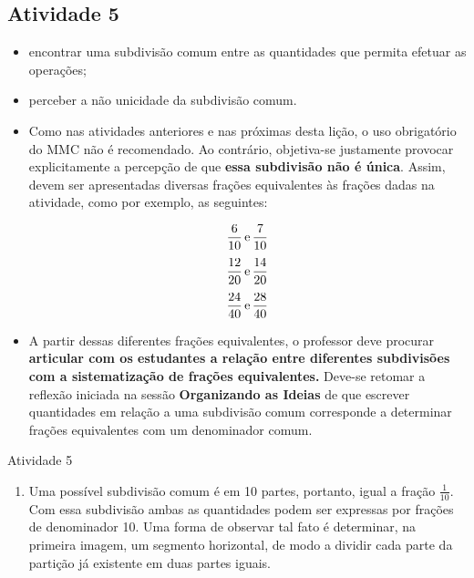\newpage
\begin{multicols}{2}
\subsection{Atividade 5}

  \newline \vspace{.15cm}

  \begin{itemize} %
    \item       encontrar uma subdivisão comum entre as quantidades que permita efetuar as operações;
    \item       perceber a não unicidade da subdivisão comum.
\end{itemize} %

   \vspace{.15cm}

  \begin{itemize} %
    \item       Como nas atividades anteriores e nas próximas desta lição, o uso obrigatório do MMC não é recomendado. Ao contrário, objetiva-se justamente provocar explicitamente a percepção de que       {\bf essa subdivisão não é única}. Assim, devem ser apresentadas diversas frações equivalentes às frações dadas na atividade, como por exemplo, as seguintes:

  $$\frac{6}{10} \,{\rm e} \, \frac{7}{10}$$
  $$\frac{12}{20} \,{\rm e} \, \frac{14}{20}$$
  $$\frac{24}{40} \,{\rm e} \, \frac{28}{40}$$

    \item       A partir dessas diferentes frações equivalentes, o professor deve procurar       {\bf articular com os estudantes a relação entre diferentes subdivisões com a sistematização de frações equivalentes.}       Deve-se retomar a reflexão iniciada na sessão       {\bf Organizando as Ideias}       de que escrever quantidades em relação a uma subdivisão comum corresponde a determinar frações equivalentes com um denominador comum.
\end{itemize} %

\begin{resposta*}{Atividade 5}
\begin{enumerate} [\quad a)] %
    \item       Uma possível subdivisão comum é em 10 partes, portanto, igual a fração       $\frac{1}{10}$. Com essa subdivisão ambas as quantidades podem ser expressas por frações de denominador 10. Uma forma de observar tal fato é determinar, na primeira imagem, um segmento horizontal, de modo a dividir cada parte da partição já existente em duas partes iguais.


\end{enumerate}
\end{resposta*}
\end{multicols}
